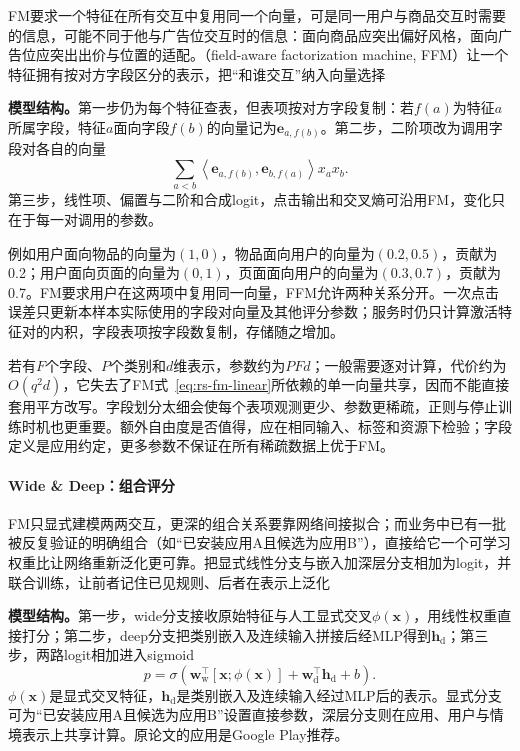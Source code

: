 FM要求一个特征在所有交互中复用同一个向量，可是同一用户与商品交互时需要的信息，可能不同于他与广告位交互时的信息：面向商品应突出偏好风格，面向广告位应突出出价与位置的适配。（field-aware factorization machine, FFM）让一个特征拥有按对方字段区分的表示，把“和谁交互”纳入向量选择

\textbf{模型结构。}第一步仍为每个特征查表，但表项按对方字段复制：若$f(a)$为特征$a$所属字段，特征$a$面向字段$f(b)$的向量记为$\bm e_{a,f(b)}$。第二步，二阶项改为调用字段对各自的向量
\begin{equation}
 \sum_{a<b}
 \left\langle\bm e_{a,f(b)},\bm e_{b,f(a)}\right\rangle x_ax_b.
 \label{eq:rs-ffm}
\end{equation}
第三步，线性项、偏置与二阶和合成logit，点击输出和交叉熵可沿用FM，变化只在于每一对调用的参数。

例如用户面向物品的向量为$(1,0)$，物品面向用户的向量为$(0.2,0.5)$，贡献为0.2；用户面向页面的向量为$(0,1)$，页面面向用户的向量为$(0.3,0.7)$，贡献为0.7。FM要求用户在这两项中复用同一向量，FFM允许两种关系分开。一次点击误差只更新本样本实际使用的字段对向量及其他评分参数；服务时仍只计算激活特征对的内积，字段表项按字段数复制，存储随之增加。

若有$F$个字段、$P$个类别和$d$维表示，参数约为$PFd$；一般需要逐对计算，代价约为$O(q^2d)$，它失去了FM式~\eqref{eq:rs-fm-linear}所依赖的单一向量共享，因而不能直接套用平方改写。字段划分太细会使每个表项观测更少、参数更稀疏，正则与停止训练时机也更重要。额外自由度是否值得，应在相同输入、标签和资源下检验；字段定义是应用约定，更多参数不保证在所有稀疏数据上优于FM。

\paragraph{Wide \& Deep：组合评分}
\label{sec:rs-wide-deep}

FM只显式建模两两交互，更深的组合关系要靠网络间接拟合；而业务中已有一批被反复验证的明确组合（如“已安装应用A且候选为应用B”），直接给它一个可学习权重比让网络重新泛化更可靠。把显式线性分支与嵌入加深层分支相加为logit，并联合训练，让前者记住已见规则、后者在表示上泛化

\textbf{模型结构。}第一步，wide分支接收原始特征与人工显式交叉$\phi(\bm x)$，用线性权重直接打分；第二步，deep分支把类别嵌入及连续输入拼接后经MLP得到$\bm h_{\mathrm d}$；第三步，两路logit相加进入sigmoid
\begin{equation}
 p=\sigma\!\left(\bm w_{\mathrm w}^{\top}
       [\bm x;\phi(\bm x)]
       +\bm w_{\mathrm d}^{\top}\bm h_{\mathrm d}+b\right).
 \label{eq:rs-wide-deep}
\end{equation}
$\phi(\bm x)$是显式交叉特征，$\bm h_{\mathrm d}$是类别嵌入及连续输入经过MLP后的表示。显式分支可为“已安装应用A且候选为应用B”设置直接参数，深层分支则在应用、用户与情境表示上共享计算。原论文的应用是Google Play推荐。

